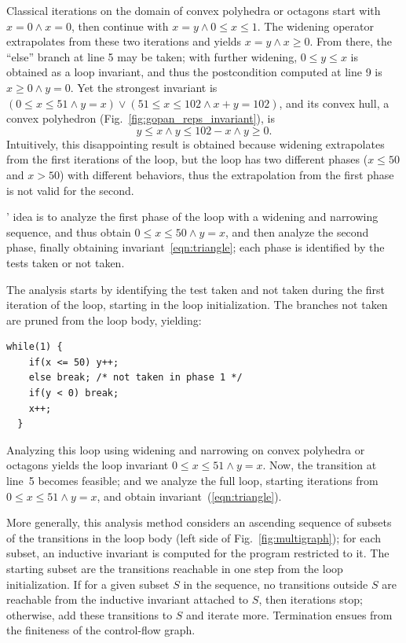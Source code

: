 \documentclass[preprint]{sigplanconf}
\begin{document}
Classical iterations on the domain of convex polyhedra \cite{CousotHalbwachs78,BagnaraHRZ05SCP} or octagons \cite{DBLP:journals/lisp/Mine06} start with $x = 0 \land x = 0$, then continue with $x = y \land 0 \leq x \leq 1$.
The widening operator extrapolates from these two iterations and yields $x = y \land x \geq 0$.
From there, the ``else'' branch at line 5 may be taken; with further widening, $0 \leq y \leq x$ is obtained as a loop invariant, and thus the postcondition computed at line 9 is $x \geq 0 \land y = 0$.
Yet the strongest invariant is $(0 \leq x \leq 51 \land y = x) \lor (51 \leq x \leq 102 \land x+y=102)$, and its convex hull, a convex polyhedron (Fig.~\ref{fig:gopan_reps_invariant}), is
\begin{equation}
y \leq x \land y \leq 102-x \land y \geq 0.\label{eqn:triangle}
\end{equation}
Intuitively, this disappointing result is obtained because widening extrapolates from the first iterations of the loop, but the loop has two different phases ($x \leq 50$ and $x > 50$) with different behaviors, thus the extrapolation from the first phase is not valid for the second.

\citeauthor{DBLP:conf/sas/GopanR07}' idea is to analyze the first phase of the loop with a widening and narrowing sequence, and thus obtain $0 \leq x \leq 50 \land y = x$, and then analyze the second phase, finally obtaining invariant~\ref{eqn:triangle}; each phase is identified by the tests taken or not taken.

The analysis starts by identifying the test taken and not taken during the first iteration of the loop, starting in the loop initialization. The branches not taken are pruned from the loop body, yielding:
\begin{lstlisting}[numbers=none]
  while(1) {
    if(x <= 50) y++;
    else break; /* not taken in phase 1 */
    if(y < 0) break;
    x++;
  }
\end{lstlisting}

Analyzing this loop using widening and narrowing on convex polyhedra or octagons yields the loop invariant $0 \leq x \leq 51 \land y = x$. Now, the transition at line~5 becomes feasible; and we analyze the full loop, starting iterations from $0 \leq x \leq 51 \land y = x$, and obtain invariant~(\ref{eqn:triangle}).

More generally, this analysis method considers an ascending sequence of subsets of the transitions in the loop body (left side of Fig.~\ref{fig:multigraph});
for each subset, an inductive invariant is computed for the program restricted to it.
The starting subset are the transitions reachable in one step from the loop initialization.
If for a given subset $S$ in the sequence, no transitions outside $S$ are reachable from the inductive invariant attached to $S$, then iterations stop;
otherwise, add these transitions to $S$ and iterate more.
Termination ensues from the finiteness of the control-flow graph.
\end{document}
